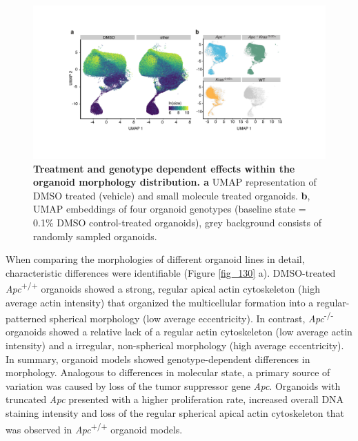 \begin{flushleft}
\bigbreak
\begin{figure}[h!]
\centering
\includegraphics[width=\textwidth,
                height=\textheight,
                keepaspectratio]{figures/adenomaprofiling/pdf/fig_1_4.pdf}
\caption[Treatment and genotype dependent effects within the organoid morphology distribution]{\textbf{Treatment and genotype dependent effects within the organoid morphology distribution. a} UMAP representation of DMSO treated (vehicle) and small molecule treated organoids. \textbf{b}, UMAP embeddings of four organoid genotypes (baseline state = 0.1\% DMSO control-treated organoids), grey background consists of randomly sampled organoids.}
\label{fig_140}
\end{figure}

When comparing the morphologies of different organoid lines in detail, characteristic differences were identifiable (Figure \ref{fig_130} a). DMSO-treated \textit{Apc}\textsuperscript{+/+} organoids showed a strong, regular apical actin cytoskeleton (high average actin intensity) that organized the multicellular formation into a regular-patterned spherical morphology (low average eccentricity). In contrast, \textit{Apc}\textsuperscript{-/-}  organoids showed a relative lack of a regular actin cytoskeleton (low average actin intensity) and a irregular, non-spherical morphology (high average eccentricity). In summary, organoid models showed genotype-dependent differences in morphology. Analogous to differences in molecular state, a primary source of variation was caused by loss of the tumor suppressor gene \textit{Apc}. Organoids with truncated \textit{Apc} presented with a higher proliferation rate, increased overall DNA staining intensity and loss of the regular spherical apical actin cytoskeleton that was observed in \textit{Apc}\textsuperscript{+/+} organoid models.


\end{flushleft}
